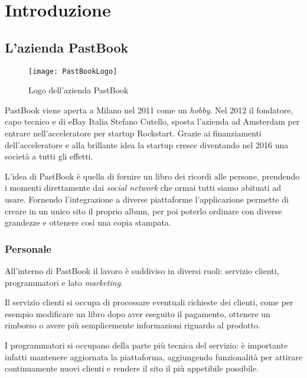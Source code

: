 \mainmatter

\chapter{Introduzione}

\section{L'azienda PastBook}

\begin{figure}[H]
  \centering
  \texttt{[image: PastBookLogo]}
  \caption{Logo dell'azienda PastBook}
\end{figure}

PastBook viene aperta a Milano nel 2011 come un \textit{hobby}. Nel 2012 il
fondatore, capo tecnico e  di eBay Italia
Stefano Cutello, sposta l'azienda ad Amsterdam per entrare nell'acceleratore
per \gls{startup} Rockstart. Grazie ai finanziamenti dell'acceleratore e alla
brillante idea la \gls{startup} cresce diventando nel 2016 una società a tutti
gli effetti.

L'idea di PastBook è quella di fornire un libro dei ricordi alle
persone, prendendo i momenti direttamente dai \textit{social network} che ormai
tutti siamo abituati ad usare. Fornendo l'integrazione a diverse piattaforme
l'applicazione permette di creare in un unico sito il proprio album, per poi
poterlo ordinare con diverse grandezze e ottenere così una copia stampata.

\subsection{Personale}

All'interno di PastBook il lavoro è suddiviso in diversi ruoli: servizio
clienti, programmatori e lato \textit{marketing}.

Il servizio clienti si occupa di processare eventuali richieste dei clienti,
come per esempio modificare un libro dopo aver eseguito il pagamento, ottenere
un rimborso o avere più semplicemente informazioni riguardo al prodotto.

I programmatori si occupano della parte più tecnica del servizio: è importante
infatti mantenere aggiornata la piattaforma, aggiungendo funzionalità
per attirare continuamente nuovi clienti e rendere il sito il più appetibile
possibile.

